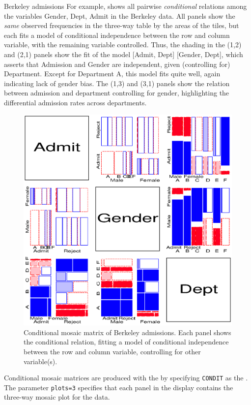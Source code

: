 \begin{Example}[berkeley4b]{Berkeley admissions}
For example,  shows all pairwise \emph{conditional}
relations among the variables Gender, Dept, Admit in the Berkeley data.
All panels show the \emph{same} observed frequencies in the three-way table
by the areas of the tiles,
but each fits a model of conditional independence between the row and
column variable, with the remaining variable controlled.
Thus, the shading in the (1,2) and (2,1) panels show the fit of the model
[Admit, Dept] [Gender, Dept],
which asserts that Admission and Gender are independent, given (controlling
for) Department.  Except for Department A, this model fits quite well,
again indicating lack of gender bias.
The (1,3) and (3,1) panels show the relation between admission and department
controlling for gender, highlighting the differential admission rates
across departments.
\begin{figure}[!htb]
  \centering
  \includegraphics[scale=.8]{ch4/fig/mosmat9b}
  \caption[Conditional mosaic matrix of Berkeley
admissions]{Conditional mosaic matrix of Berkeley
admissions.  Each panel shows the conditional relation,
fitting a model of conditional independence between the row and column variable, controlling for other variable(s).}\label{fig:mosmat9b}
\end{figure}

Conditional mosaic matrices are produced with the 
by specifying \texttt{CONDIT} as the .
The parameter \texttt{plots=3} specifies that each panel in the
display contains the three-way mosaic plot for the data.

\end{Example}
